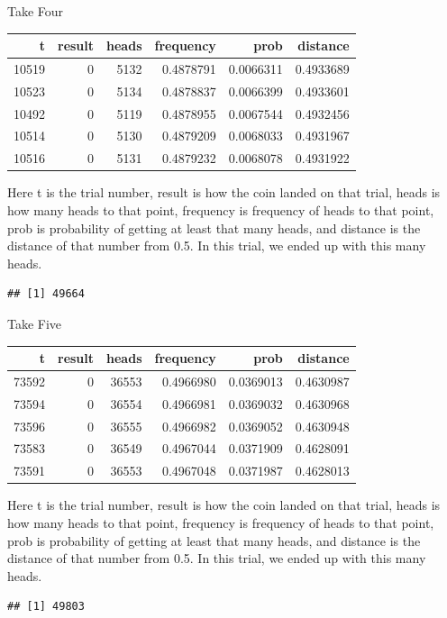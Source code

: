 \documentclass[
  ignorenonframetext,
]{beamer}
\renewcommand{\,}{\text{, }}
\begin{document}
\begin{frame}[fragile]{Take Four}
\protect\hypertarget{take-four}{}

\begin{longtable}[]{@{}rrrrrr@{}}
\toprule
t & result & heads & frequency & prob & distance\tabularnewline
\midrule
\endhead
10519 & 0 & 5132 & 0.4878791 & 0.0066311 & 0.4933689\tabularnewline
10523 & 0 & 5134 & 0.4878837 & 0.0066399 & 0.4933601\tabularnewline
10492 & 0 & 5119 & 0.4878955 & 0.0067544 & 0.4932456\tabularnewline
10514 & 0 & 5130 & 0.4879209 & 0.0068033 & 0.4931967\tabularnewline
10516 & 0 & 5131 & 0.4879232 & 0.0068078 & 0.4931922\tabularnewline
\bottomrule
\end{longtable}

Here t is the trial number, result is how the coin landed on that trial,
heads is how many heads to that point, frequency is frequency of heads
to that point, prob is probability of getting at least that many heads,
and distance is the distance of that number from 0.5. In this trial, we
ended up with this many heads.

\begin{verbatim}
## [1] 49664
\end{verbatim}

\end{frame}

\begin{frame}[fragile]{Take Five}
\protect\hypertarget{take-five}{}

\begin{longtable}[]{@{}rrrrrr@{}}
\toprule
t & result & heads & frequency & prob & distance\tabularnewline
\midrule
\endhead
73592 & 0 & 36553 & 0.4966980 & 0.0369013 & 0.4630987\tabularnewline
73594 & 0 & 36554 & 0.4966981 & 0.0369032 & 0.4630968\tabularnewline
73596 & 0 & 36555 & 0.4966982 & 0.0369052 & 0.4630948\tabularnewline
73583 & 0 & 36549 & 0.4967044 & 0.0371909 & 0.4628091\tabularnewline
73591 & 0 & 36553 & 0.4967048 & 0.0371987 & 0.4628013\tabularnewline
\bottomrule
\end{longtable}

Here t is the trial number, result is how the coin landed on that trial,
heads is how many heads to that point, frequency is frequency of heads
to that point, prob is probability of getting at least that many heads,
and distance is the distance of that number from 0.5. In this trial, we
ended up with this many heads.

\begin{verbatim}
## [1] 49803
\end{verbatim}

\end{frame}
\end{document}
